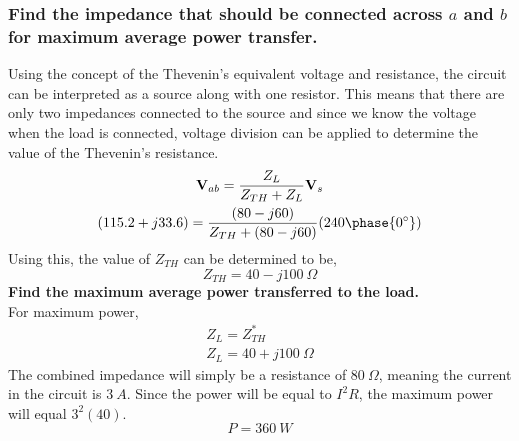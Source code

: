 \documentclass[12pt]{article}
\begin{document}
    \subsubsection*{Find the impedance that should be connected across $a$ and
    $b$ for maximum average power transfer.}
    Using the concept of the Thevenin's equivalent voltage and resistance, the
    circuit can be interpreted as a source along with one resistor. This means
    that there are only two impedances connected to the source and since we know
    the voltage when the load is connected, voltage division can be applied to
    determine the value of the Thevenin's resistance.
    \begin{gather*}
        \textbf{V}_{ab} = \frac{Z_{L}}{Z_{TH} + Z_{L}} \textbf{V}_{s} \\
        (115.2 + j 33.6) = \frac{(80 - j 60)}{Z_{TH} + (80 - j 60)} (240
        \phase{0^{\circ}})
    \end{gather*}
    Using this, the value of $Z_{TH}$ can be determined to be,
    \[
        \boxed{Z_{TH} = 40 - j 100\ \Omega}
    \]
    \textbf{Find the maximum average power transferred to the load.}
    \\ For maximum power,
    \begin{gather*}
        Z_{L} = Z_{TH}^{*} \\
        Z_{L} = 40 + j 100\ \Omega
    \end{gather*}
    The combined impedance will simply be a resistance of $80\ \Omega$, meaning
    the current in the circuit is $3\ A$. Since the power will be equal to
    $I^2R$, the maximum power will equal $3^2(40)$.
    \[
        \boxed{P = 360\ W}
    \]
\end{document}
